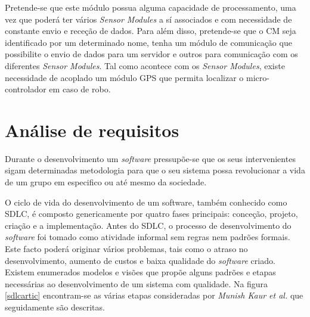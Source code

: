 Pretende-se que este módulo possua alguma capacidade de processamento, uma vez que poderá ter vários \textit{Sensor Modules} a sí associados e com necessidade de constante envio e receção de dados.  Para além disso, pretende-se que o \acl{CM} seja identificado por um determinado nome, tenha um  módulo de comunicação que possibilite o envio de dados para um servidor e outros para comunicação com os diferentes \textit{Sensor Modules}. Tal como acontece com os \textit{Sensor Modules}, existe necessidade de acoplado um módulo \ac{GPS} que permita localizar o micro-controlador em caso de robo.
 





\newpage







\section{Análise de requisitos}
\label{sect:analise}

Durante o desenvolvimento um \textit{software} pressupõe-se que os seus intervenientes sigam determinadas metodologia para que o seu sistema possa revolucionar a vida de um grupo em especifico ou até mesmo da sociedade. 


O ciclo de vida do desenvolvimento de um software, também conhecido como \ac{SDLC}, é composto genericamente por quatro fases principais: conceção, projeto, criação e a implementação. Antes do \ac{SDLC}, o processo de desenvolvimento do \textit{software} foi tomado como atividade informal sem regras nem padrões formais. Este facto poderá originar vários problemas, tais como o atraso no desenvolvimento, aumento de custos e baixa qualidade do \textit{software} criado. Existem enumerados modelos e visões que propõe alguns padrões e etapas necessárias ao desenvolvimento de um sistema com qualidade.
Na figura \ref{sdlcartic} encontram-se as várias etapas consideradas por \textit{Munish Kaur et al.}\cite{Saini2014} que seguidamente são descritas. 





